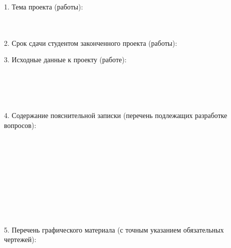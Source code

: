 {  1. Тема проекта (работы):
  \lineunderscore\\
  \lineunderscore\\
  \lineunderscore\\

  \vspace{1em}

  2. Срок сдачи студентом законченного проекта (работы): \lineunderscore

  \vspace{1em}

  3. Исходные данные к проекту (работе):
  \lineunderscore\\
  \lineunderscore\\
  \lineunderscore\\
  \lineunderscore\\
  \lineunderscore\\
  \lineunderscore

  \vspace{1em}

  4. Содержание пояснительной записки (перечень подлежащих разработке вопросов):
  \lineunderscore\\
  \lineunderscore\\
  \lineunderscore\\
  \lineunderscore\\
  \lineunderscore\\
  \lineunderscore\\
  \lineunderscore\\
  \lineunderscore\\
  \lineunderscore\\
  \lineunderscore\\
  \lineunderscore

  \clearpage
  \thispagestyle{empty}

  5. Перечень графического материала (с точным указанием обязательных чертежей):
  \lineunderscore\\
  \lineunderscore\\
  \lineunderscore\\
  \lineunderscore\\
  \lineunderscore\\
  \lineunderscore\\
  \lineunderscore\\
  \lineunderscore

}

